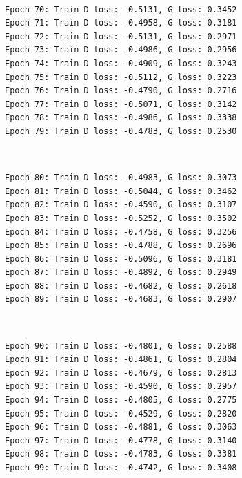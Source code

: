 \documentclass[11pt]{article}
\begin{document}
    \begin{center}
    \end{center}
    { \hspace*{\fill} \\}
    
    \begin{Verbatim}[commandchars=\\\{\}]
Epoch 70: Train D loss: -0.5131, G loss: 0.3452
Epoch 71: Train D loss: -0.4958, G loss: 0.3181
Epoch 72: Train D loss: -0.5131, G loss: 0.2971
Epoch 73: Train D loss: -0.4986, G loss: 0.2956
Epoch 74: Train D loss: -0.4909, G loss: 0.3243
Epoch 75: Train D loss: -0.5112, G loss: 0.3223
Epoch 76: Train D loss: -0.4790, G loss: 0.2716
Epoch 77: Train D loss: -0.5071, G loss: 0.3142
Epoch 78: Train D loss: -0.4986, G loss: 0.3338
Epoch 79: Train D loss: -0.4783, G loss: 0.2530

    \end{Verbatim}

    \begin{center}
    \end{center}
    { \hspace*{\fill} \\}
    
    \begin{Verbatim}[commandchars=\\\{\}]
Epoch 80: Train D loss: -0.4983, G loss: 0.3073
Epoch 81: Train D loss: -0.5044, G loss: 0.3462
Epoch 82: Train D loss: -0.4590, G loss: 0.3107
Epoch 83: Train D loss: -0.5252, G loss: 0.3502
Epoch 84: Train D loss: -0.4758, G loss: 0.3256
Epoch 85: Train D loss: -0.4788, G loss: 0.2696
Epoch 86: Train D loss: -0.5096, G loss: 0.3181
Epoch 87: Train D loss: -0.4892, G loss: 0.2949
Epoch 88: Train D loss: -0.4682, G loss: 0.2618
Epoch 89: Train D loss: -0.4683, G loss: 0.2907

    \end{Verbatim}

    \begin{center}
    \end{center}
    { \hspace*{\fill} \\}
    
    \begin{Verbatim}[commandchars=\\\{\}]
Epoch 90: Train D loss: -0.4801, G loss: 0.2588
Epoch 91: Train D loss: -0.4861, G loss: 0.2804
Epoch 92: Train D loss: -0.4679, G loss: 0.2813
Epoch 93: Train D loss: -0.4590, G loss: 0.2957
Epoch 94: Train D loss: -0.4805, G loss: 0.2775
Epoch 95: Train D loss: -0.4529, G loss: 0.2820
Epoch 96: Train D loss: -0.4881, G loss: 0.3063
Epoch 97: Train D loss: -0.4778, G loss: 0.3140
Epoch 98: Train D loss: -0.4783, G loss: 0.3381
Epoch 99: Train D loss: -0.4742, G loss: 0.3408

    \end{Verbatim}
\end{document}
